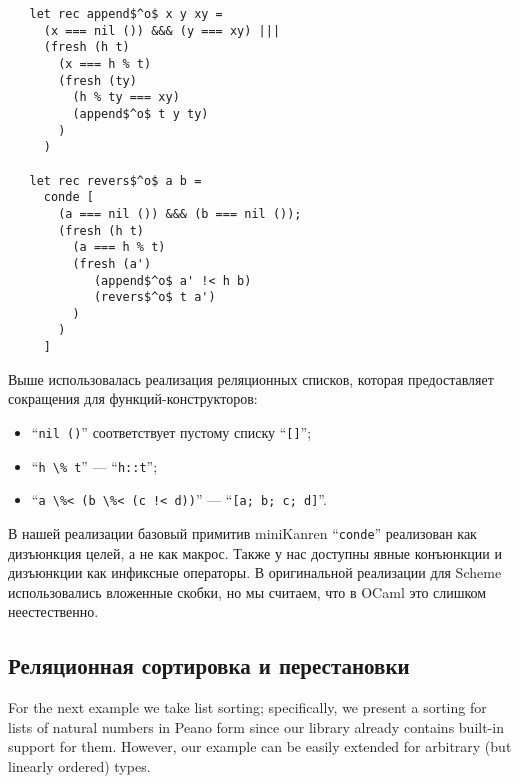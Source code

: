 \begin{lstlisting}
   let rec append$^o$ x y xy =
     (x === nil ()) &&& (y === xy) |||
     (fresh (h t)
       (x === h % t)
       (fresh (ty)
         (h % ty === xy)
         (append$^o$ t y ty)
       )
     )

   let rec revers$^o$ a b =
     conde [
       (a === nil ()) &&& (b === nil ());
       (fresh (h t)
         (a === h % t)
         (fresh (a')
            (append$^o$ a' !< h b)
            (revers$^o$ t a')
         )
       )
     ]
\end{lstlisting}

Выше использовалась реализация реляционных списков, которая предоставляет сокращения для функций-конструкторов:

\begin{itemize}
  \item \enquote{\lstinline=nil ()=} соответствует пустому списку \enquote{\lstinline=[]=};
  \item \enquote{\lstinline[mathescape=false]=h \% t=} --- \enquote{\lstinline[mathescape=false]=h::t=};
  \item \enquote{\lstinline=a \%< (b \%< (c !< d))=} --- \enquote{\lstinline=[a; b; c; d]=}.
\end{itemize}

В нашей реализации базовый примитив miniKanren \enquote{\lstinline|conde|} реализован как дизъюнкция целей, а не как макрос.
Также у нас доступны явные конъюнкции и дизъюнкции как инфиксные операторы.
В оригинальной реализации для Scheme использовались вложенные скобки, но мы считаем, что в OCaml это слишком неестественно.


\subsection{Реляционная сортировка и перестановки}

For the next example we take list sorting; specifically, we present a sorting for lists of natural numbers
in Peano form since our library already contains built-in support for them. However, our example can be
easily extended for arbitrary (but linearly ordered) types.

